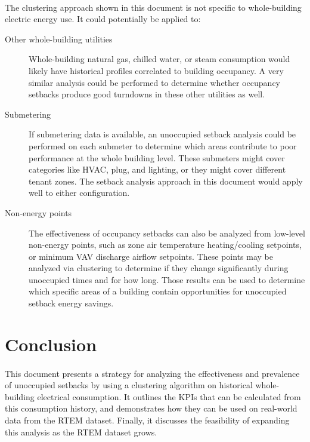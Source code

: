 \documentclass[a4paper]{article}
\begin{document}
\paragraph{}
The clustering approach shown in this document is not specific to whole-building electric energy use. It could potentially be applied to:
\begin{description}
\item[Other whole-building utilities]{Whole-building natural gas, chilled water, or steam consumption would likely have historical profiles correlated to building occupancy. A very similar analysis could be performed to determine whether occupancy setbacks produce good turndowns in these other utilities as well.}
\item[Submetering]{If submetering data is available, an unoccupied setback analysis could be performed on each submeter to determine which areas contribute to poor performance at the whole building level. These submeters might cover categories like HVAC, plug, and lighting, or they might cover different tenant zones. The setback analysis approach in this document would apply well to either configuration.}
\item[Non-energy points]{The effectiveness of occupancy setbacks can also be analyzed from low-level non-energy points, such as zone air temperature heating/cooling setpoints, or minimum VAV discharge airflow setpoints. These points may be analyzed via clustering to determine if they change significantly during unoccupied times and for how long. Those results can be used to determine which specific areas of a building contain opportunities for unoccupied setback energy savings.}
\end{description}

\section{Conclusion}

\paragraph{}
This document presents a strategy for analyzing the effectiveness and prevalence of unoccupied setbacks by using a clustering algorithm on historical whole-building electrical consumption. It outlines the KPIs that can be calculated from this consumption history, and demonstrates how they can be used on real-world data from the RTEM dataset. Finally, it discusses the feasibility of expanding this analysis as the RTEM dataset grows.
\end{document}
